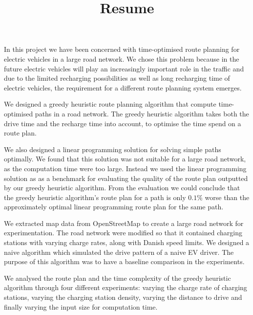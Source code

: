 \documentclass[a4paper, 12pt]{article}
\title{Resume}
\begin{document}
\maketitle
In this project we have been concerned with time-optimised route planning for electric vehicles in a large road network. We chose this problem because in the future electric vehicles will play an increasingly important role in the traffic and due to the limited recharging possibilities as well as long recharging time of electric vehicles, the requirement for a different route planning system emerges.

We designed a greedy heuristic route planning algorithm that compute time-optimised paths in a road network. The greedy heuristic algorithm takes both the drive time and the recharge time into account, to optimise the time spend on a route plan. 

We also designed a linear programming solution for solving simple paths optimally. We found that this solution was not suitable for a large road network, as the computation time were too large. Instead we used the linear programming solution as as a benchmark for evaluating the quality of the route plan outputted by our greedy heuristic algorithm. From the evaluation we could conclude that the greedy heuristic algorithm's route plan for a path is only $0.1\%$ worse than the approximately optimal linear programming route plan for the same path.

We extracted map data from OpenStreetMap to create a large road network for experimentation. The road network were modified so that it contained charging stations with varying charge rates, along with Danish speed limits. We designed a naive algorithm which simulated the drive pattern of a naive EV driver. The purpose of this algorithm was to have a baseline comparison in the experiments.

We analysed the route plan and the time complexity of the greedy heuristic algorithm through four different experiments: varying the charge rate of charging stations, varying the charging station density, varying the distance to drive and finally varying the input size for computation time. 
\end{document}
